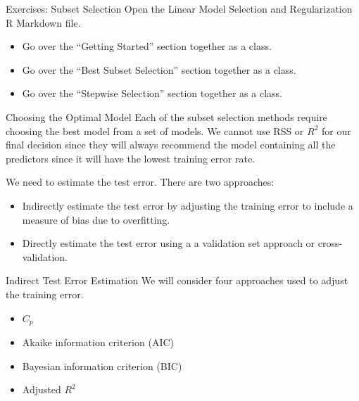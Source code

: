 \documentclass[
  ignorenonframetext,
  aspectratio=169,
]{beamer}
\begin{document}
\begin{frame}{Exercises: Subset Selection}
\protect\hypertarget{exercises-subset-selection}{}
Open the Linear Model Selection and Regularization R Markdown file.

\begin{itemize}
\item
  Go over the ``Getting Started'' section together as a class.
\item
  Go over the ``Best Subset Selection'' section together as a class.
\item
  Go over the ``Stepwise Selection'' section together as a class.
\end{itemize}
\end{frame}

\begin{frame}{Choosing the Optimal Model}
\protect\hypertarget{choosing-the-optimal-model}{}
Each of the subset selection methods require choosing the best model
from a set of models. We cannot use RSS or \(R^2\) for our final
decision since they will always recommend the model containing all the
predictors since it will have the lowest training error rate.

We need to estimate the test error. There are two approaches:

\begin{itemize}
\item
  \alert{Indirectly estimate the test error} by adjusting the training
  error to include a measure of bias due to overfitting.
\item
  \alert{Directly estimate the test error} using a a validation set
  approach or cross-validation.
\end{itemize}
\end{frame}

\begin{frame}{Indirect Test Error Estimation}
\protect\hypertarget{indirect-test-error-estimation}{}
We will consider four approaches used to adjust the training error.

\begin{itemize}
\item
  \(C_p\)
\item
  Akaike information criterion (AIC)
\item
  Bayesian information criterion (BIC)
\item
  Adjusted \(R^2\)
\end{itemize}
\end{frame}
\end{document}
